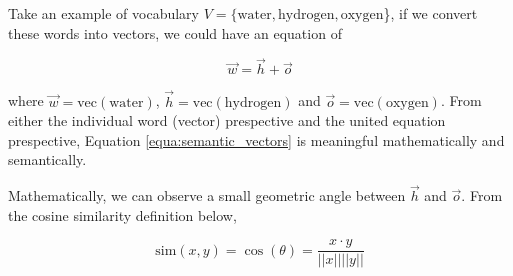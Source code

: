 \documentclass[thesis,fonts=libertine]{cluu}
\begin{document}
Take an example of vocabulary $V=\{\text{water}, \text{hydrogen},  \text{oxygen}$\}, if we convert these words into vectors, we could have an equation of

\begin{equation}
  \label{equa:semantic_vectors}
  \vec{w}=\vec{h}+\vec{o}
\end{equation}

\noindent where $\vec{w} = \text{vec}(\text{water})$, $\vec{h} = \text{vec}(\text{hydrogen})$ and $\vec{o} = \text{vec}(\text{oxygen})$. From either the individual word (vector) prespective and the united equation prespective, Equation \ref{equa:semantic_vectors} is meaningful mathematically and semantically.

Mathematically, we can observe a small geometric angle between $\vec{h}$ and $\vec{o}$. From the cosine similarity definition below,

\begin{equation*}
  \text{sim}(x, y) = \cos(\theta) = \frac{x \cdot y}{||x||||y||}
\end{equation*}
\end{document}
